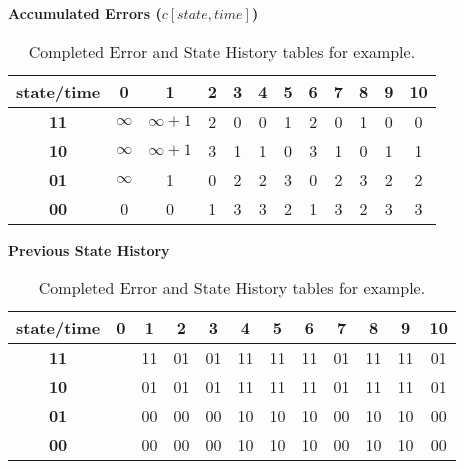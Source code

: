 \begin{table}
\center
\textbf{Accumulated Errors ($c[state,time]$)}

\begin{tabular}{c|c|c|c|c|c|c|c|c|c|c|c}
state/time & 0 & 1 & 2 & 3 & 4 & 5 & 6 & 7 & 8 & 9 & 10 \\
\hline
\textbf{11} & $\infty$ & $\infty+1$ & 2 & 0 & 0 & 1 & 2 & 0 & 1 & 0 & 0 \\
\hline
\textbf{10} & $\infty$ & $\infty+1$ & 3 & 1 & 1 & 0 & 3 & 1 & 0 & 1 & 1 \\
\hline
\textbf{01} & $\infty$ &          1 & 0 & 2 & 2 & 3 & 0 & 2 & 3 & 2 & 2 \\
\hline
\textbf{00} &        0 &          0 & 1 & 3 & 3 & 2 & 1 & 3 & 2 & 3 & 3 \\
\hline
\end{tabular}

\textbf{Previous State History}

\begin{tabular}{c|c|c|c|c|c|c|c|c|c|c|c}
state/time & 0 & 1 & 2 & 3 & 4 & 5 & 6 & 7 & 8 & 9 & 10 \\
\hline
\textbf{11} & & 11 & 01 & 01 & 11 & 11 & 11 & 01 & 11 & 11 & 01 \\
\hline
\textbf{10} & & 01 & 01 & 01 & 11 & 11 & 11 & 01 & 11 & 11 & 01 \\
\hline
\textbf{01} & & 00 & 00 & 00 & 10 & 10 & 10 & 00 & 10 & 10 & 00 \\
\hline
\textbf{00} & & 00 & 00 & 00 & 10 & 10 & 10 & 00 & 10 & 10 & 00 \\
\hline
\end{tabular}

\caption{Completed Error and State History tables for example.}
\label{tbl:decode-state-tables}
\end{table}
